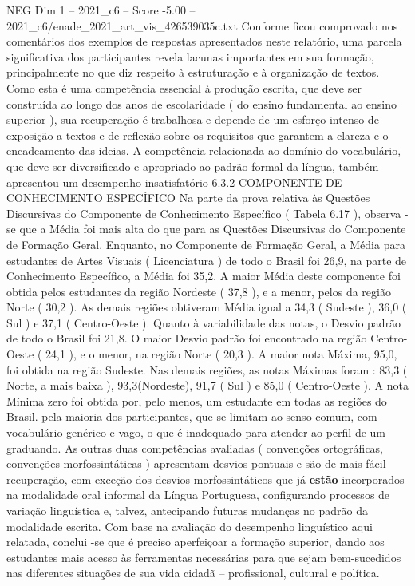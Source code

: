 \begin{textsample}{NEG Dim 1 – 2021\_c6 – Score -5.00 – 2021\_c6/enade\_2021\_art\_vis\_426539035c.txt}
Conforme ficou comprovado nos comentários dos exemplos de respostas apresentados neste relatório, uma parcela significativa dos participantes revela lacunas importantes em sua formação, principalmente no que diz respeito à estruturação e à organização de textos.
Como esta é uma competência essencial à produção escrita, que deve ser construída ao longo dos anos de escolaridade ( do ensino fundamental ao ensino superior ), sua recuperação é trabalhosa e depende de um esforço intenso de exposição a textos e de reflexão sobre os requisitos que garantem a clareza e o encadeamento das ideias.
A competência relacionada ao domínio do vocabulário, que deve ser diversificado e apropriado ao padrão formal da língua, também apresentou um desempenho insatisfatório 6.3.2 COMPONENTE DE CONHECIMENTO ESPECÍFICO Na parte da prova relativa às Questões Discursivas do Componente de Conhecimento Específico ( Tabela 6.17 ), observa -se que a Média foi mais alta do que para as Questões Discursivas do Componente de Formação Geral.
Enquanto, no Componente de Formação Geral, a Média para estudantes de Artes Visuais ( Licenciatura ) de todo o Brasil foi 26,9, na parte de Conhecimento Específico, a Média foi 35,2.
A maior Média deste componente foi obtida pelos estudantes da região Nordeste ( 37,8 ), e a menor, pelos da região Norte ( 30,2 ).
As demais regiões obtiveram Média igual a 34,3 ( Sudeste ), 36,0 ( Sul ) e 37,1 ( Centro-Oeste ).
Quanto à variabilidade das notas, o Desvio padrão de todo o Brasil foi 21,8.
O maior Desvio padrão foi encontrado na região Centro-Oeste ( 24,1 ), e o menor, na região Norte ( 20,3 ).
A maior nota Máxima, 95,0, foi obtida na região Sudeste.
Nas demais regiões, as notas Máximas foram : 83,3 ( Norte, a mais baixa ), 93,3(Nordeste), 91,7 ( Sul ) e 85,0 ( Centro-Oeste ).
A nota Mínima zero foi obtida por, pelo menos, um estudante em todas as regiões do Brasil. pela maioria dos participantes, que se limitam ao senso comum, com vocabulário genérico e vago, o que é inadequado para atender ao perfil de um graduando.
As outras duas competências avaliadas ( convenções ortográficas, convenções morfossintáticas ) apresentam desvios pontuais e são de mais fácil recuperação, com exceção dos desvios morfossintáticos que já \textbf{estão} incorporados na modalidade oral informal da Língua Portuguesa, configurando processos de variação linguística e, talvez, antecipando futuras mudanças no padrão da modalidade escrita.
Com base na avaliação do desempenho linguístico aqui relatada, conclui -se que é preciso aperfeiçoar a formação superior, dando aos estudantes mais acesso às ferramentas necessárias para que sejam bem-sucedidos nas diferentes situações de sua vida cidadã – profissional, cultural e política.

\end{textsample}
